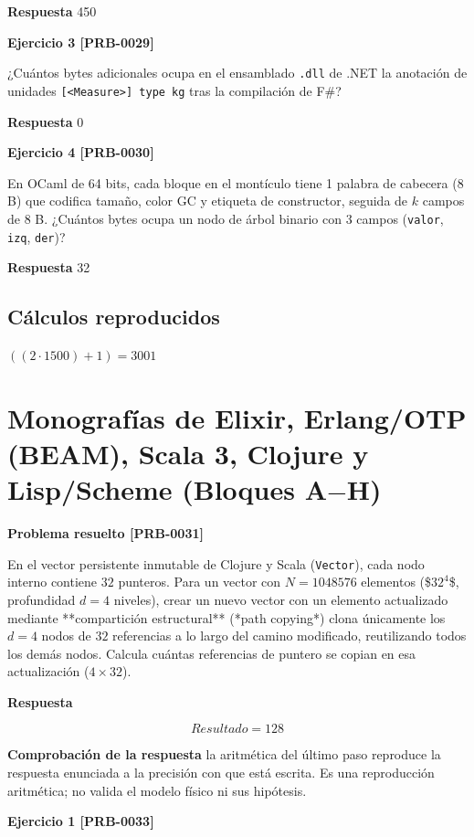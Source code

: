 \documentclass{book}
\begin{document}
\noindent\textbf{Respuesta} 450

\noindent\textbf{Ejercicio 3 [PRB-0029]}

¿Cuántos bytes adicionales ocupa en el ensamblado \texttt{.dll} de .NET la anotación de unidades \texttt{[<Measure>] type kg} tras la compilación de F\#?

\noindent\textbf{Respuesta} 0

\noindent\textbf{Ejercicio 4 [PRB-0030]}

En OCaml de 64 bits, cada bloque en el montículo tiene 1 palabra de cabecera (8 B) que codifica tamaño, color GC y etiqueta de constructor, seguida de \(k\) campos de 8 B. ¿Cuántos bytes ocupa un nodo de árbol binario con 3 campos (\texttt{valor}, \texttt{izq}, \texttt{der})?

\noindent\textbf{Respuesta} 32

\subsection*{Cálculos reproducidos}

\(\left(\left(2\cdot 1500\right)+1\right) = 3001\)

\section{Monografías de Elixir, Erlang/OTP (BEAM), Scala 3, Clojure y Lisp/Scheme (Bloques A\(-\)H)}

\noindent\textbf{Problema resuelto [PRB-0031]}

En el vector persistente inmutable de Clojure y Scala (\texttt{Vector}), cada nodo interno contiene \(32\) punteros. Para un vector con \(N = 1048576\) elementos (\$\(32^4\)\$, profundidad \(d = 4\) niveles), crear un nuevo vector con un elemento actualizado mediante **compartición estructural** (*path copying*) clona únicamente los \(d = 4\) nodos de \(32\) referencias a lo largo del camino modificado, reutilizando todos los demás nodos. Calcula cuántas referencias de puntero se copian en esa actualización (\(4 \times 32\)).

\noindent\textbf{Respuesta}

\[
Resultado = 128
\]

\noindent\textbf{Comprobación de la respuesta} la aritmética del último paso reproduce la respuesta enunciada a la precisión con que está escrita. Es una reproducción aritmética; no valida el modelo físico ni sus hipótesis.

\noindent\textbf{Ejercicio 1 [PRB-0033]}
\end{document}
